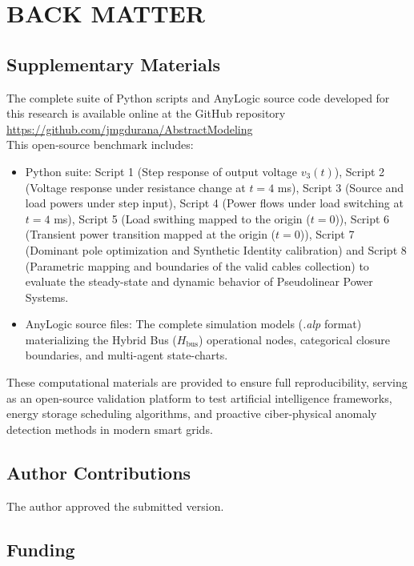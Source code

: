 \documentclass[energies,accept,oneauthor,pdftex]{Definitions/mdpi}
\begin{document}
%
%

\section{BACK MATTER}

\subsection{Supplementary Materials}
The complete suite of Python scripts and AnyLogic source code developed for this research is available online at the GitHub repository\;  \url{https://github.com/jmgdurana/AbstractModeling}\\
This open-source benchmark includes:
\begin{itemize}
\item {Python suite:}
Script 1 (Step response of output voltage $v_3(t)$),
Script 2 (Voltage response under resistance change at $t=4$ ms),
Script 3 (Source and load powers under step input),
Script 4 (Power flows under load switching at $t=4$ ms),
Script 5 (Load swithing mapped to the origin ($t=0$)),
Script 6 (Transient power transition mapped at the origin ($t=0$)),
Script 7 (Dominant pole optimization and Synthetic Identity calibration) and
Script 8 (Parametric mapping and boundaries of the valid cables collection)
 to evaluate the steady-state and dynamic behavior of Pseudolinear Power Systems.
    \item {AnyLogic source files:} The complete simulation models (\textit{.alp} format) materializing the Hybrid Bus ($H_{\text{bus}}$) operational nodes, categorical closure boundaries, and multi-agent state-charts.
\end{itemize}



These computational materials are provided to ensure full reproducibility, serving as an open-source validation platform to test artificial intelligence frameworks, energy storage scheduling algorithms, and proactive ciber-physical anomaly detection methods in modern smart grids.


\subsection{Author Contributions}

The author approved the submitted version.

\subsection{Funding}
\end{document}

